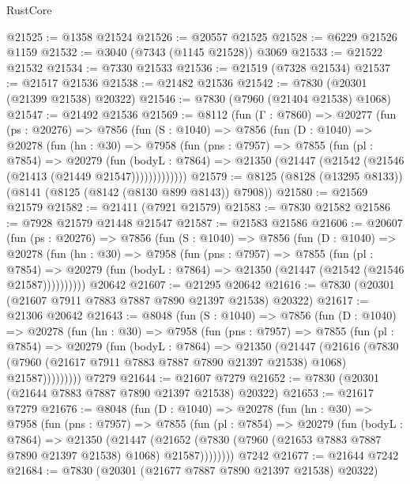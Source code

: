 \begin{lexlean}{RustCore}
\begin{coremodule}
@21525 := @1358 @21524
@21526 := @20557 @21525
@21528 := @6229 @21526 @1159
@21532 := @3040 (@7343 (@1145 @21528)) @3069
@21533 := @21522 @21532
@21534 := @7330 @21533
@21536 := @21519 (@7328 @21534)
@21537 := @21517 @21536
@21538 := @21482 @21536
@21542 := @7830 (@20301 (@21399 @21538) @20322)
@21546 := @7830 (@7960 (@21404 @21538) @1068)
@21547 := @21492 @21536
@21569 := @8112
    (fun (Γ : @7860) =>
    @20277
      (fun (ps : @20276) =>
      @7856
        (fun (S : @1040) =>
        @7856
          (fun (D : @1040) =>
          @20278
            (fun (hn : @30) =>
            @7958
              (fun (pns : @7957) =>
              @7855
                (fun (pl : @7854) =>
                @20279
                  (fun (bodyL : @7864) =>
                  @21350 (@21447 (@21542 (@21546 (@21413 (@21449 @21547)))))))))))))
@21579 := @8125 (@8128 (@13295 @8133)) (@8141 (@8125 (@8142 (@8130 @899 @8143)) @7908))
@21580 := @21569 @21579
@21582 := @21411 (@7921 @21579)
@21583 := @7830 @21582
@21586 := @7928 @21579 @21448 @21547
@21587 := @21583 @21586
@21606 := @20607
    (fun (ps : @20276) =>
    @7856
      (fun (S : @1040) =>
      @7856
        (fun (D : @1040) =>
        @20278
          (fun (hn : @30) =>
          @7958
            (fun (pns : @7957) =>
            @7855
              (fun (pl : @7854) =>
              @20279 (fun (bodyL : @7864) => @21350 (@21447 (@21542 (@21546 @21587))))))))))
    @20642
@21607 := @21295 @20642
@21616 := @7830 (@20301 (@21607 @7911 @7883 @7887 @7890 @21397 @21538) @20322)
@21617 := @21306 @20642
@21643 := @8048
    (fun (S : @1040) =>
    @7856
      (fun (D : @1040) =>
      @20278
        (fun (hn : @30) =>
        @7958
          (fun (pns : @7957) =>
          @7855
            (fun (pl : @7854) =>
            @20279
              (fun (bodyL : @7864) =>
              @21350
                (@21447
                  (@21616
                    (@7830
                      (@7960 (@21617 @7911 @7883 @7887 @7890 @21397 @21538) @1068)
                      @21587)))))))))
    @7279
@21644 := @21607 @7279
@21652 := @7830 (@20301 (@21644 @7883 @7887 @7890 @21397 @21538) @20322)
@21653 := @21617 @7279
@21676 := @8048
    (fun (D : @1040) =>
    @20278
      (fun (hn : @30) =>
      @7958
        (fun (pns : @7957) =>
        @7855
          (fun (pl : @7854) =>
          @20279
            (fun (bodyL : @7864) =>
            @21350
              (@21447
                (@21652 (@7830 (@7960 (@21653 @7883 @7887 @7890 @21397 @21538) @1068) @21587))))))))
    @7242
@21677 := @21644 @7242
@21684 := @7830 (@20301 (@21677 @7887 @7890 @21397 @21538) @20322)

\end{coremodule}
\end{lexlean}
